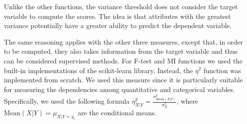 \documentclass[10pt, a4paper, twocolumn]{article}
\begin{document}
Unlike the other functions, the variance threshold does not consider the target variable to compute the scores. The idea is that attributes with the greatest variance potentially have a greater ability to predict the dependent variable. 

The same reasoning applies with the other three measures, except that, in order to be computed, they also takes information from the target variable and thus can be considered supervised methods. For F-test and MI functions we used the built-in implementations of the scikit-learn library. Instead, the $\eta^2$ function was implemented from scratch. We used this measure since it is particularly suitable for measuring the dependencies among quantitative and categorical variables. Specifically, we used the following formula $\eta^2_{X|Y} = \frac{\sigma^2_{\mathrm{Mean}(X|Y)}}{\sigma^2_X}$, where $\mathrm{Mean}(X|Y)=\mu_{X|Y=y_i}$ are the conditional means.
\end{document}
